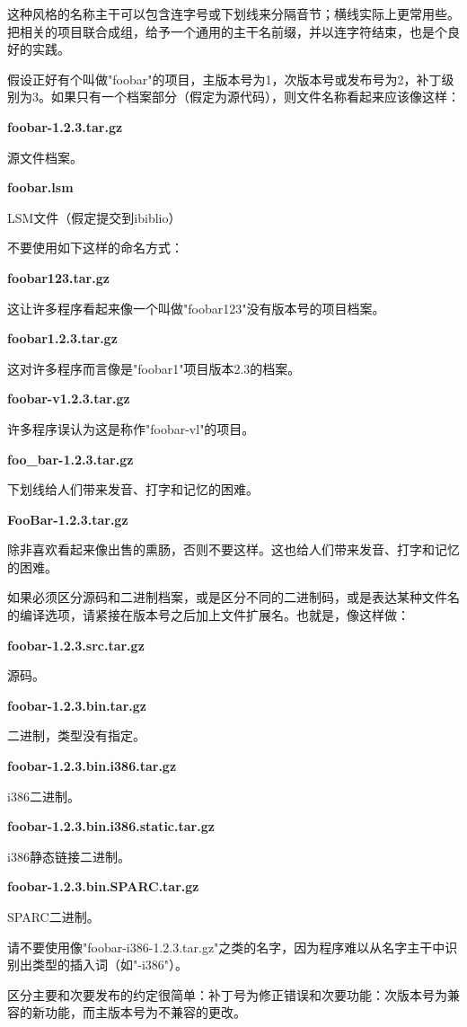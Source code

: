 \documentclass[12pt,oneside]{book}
\begin{document}
这种风格的名称主干可以包含连字号或下划线来分隔音节；横线实际上更常用些。把相关的项目联合成组，给予一个通用的主干名前缀，并以连字符结束，也是个良好的实践。

假设正好有个叫做"foobar"的项目，主版本号为1，次版本号或发布号为2，补丁级别为3。如果只有一个档案部分（假定为源代码），则文件名称看起来应该像这样：

\textbf{foobar-1.2.3.tar.gz}

源文件档案。

\textbf{foobar.lsm}

LSM文件（假定提交到ibiblio）

不要使用如下这样的命名方式：

\textbf{foobar123.tar.gz}

这让许多程序看起来像一个叫做"foobar123"没有版本号的项目档案。

\textbf{foobar1.2.3.tar.gz}

这对许多程序而言像是"foobar1"项目版本2.3的档案。

\textbf{foobar-v1.2.3.tar.gz}

许多程序误认为这是称作"foobar-vl"的项目。

\textbf{foo\_{}bar-1.2.3.tar.gz}

下划线给人们带来发音、打字和记忆的困难。

\textbf{FooBar-1.2.3.tar.gz}

除非喜欢看起来像出售的熏肠，否则不要这样。这也给人们带来发音、打字和记忆的困难。

如果必须区分源码和二进制档案，或是区分不同的二进制码，或是表达某种文件名的编译选项，请紧接在版本号之后加上文件扩展名。也就是，像这样做：

\textbf{foobar-1.2.3.src.tar.gz}

源码。

\textbf{foobar-1.2.3.bin.tar.gz}

二进制，类型没有指定。

\textbf{foobar-1.2.3.bin.i386.tar.gz}

i386二进制。

\textbf{foobar-1.2.3.bin.i386.static.tar.gz}

i386静态链接二进制。

\textbf{foobar-1.2.3.bin.SPARC.tar.gz}

SPARC二进制。

请不要使用像"foobar-i386-1.2.3.tar.gz"之类的名字，因为程序难以从名字主干中识别出类型的插入词（如"-i386"）。

区分主要和次要发布的约定很简单：补丁号为修正错误和次要功能：次版本号为兼容的新功能，而主版本号为不兼容的更改。
\end{document}
